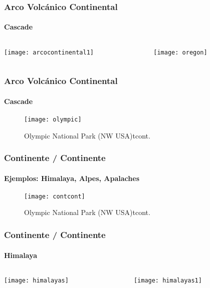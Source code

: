 \documentclass{beamer}
\begin{document}
\begin{frame}
\frametitle{Arco Volcánico Continental}
\framesubtitle{Cascade}
\begin{center}
\begin{columns}
		\begin{column}{.6\linewidth}
		 \texttt{[image: arcocontinental1]}
		\end{column}
		\begin{column}{.4\linewidth}
			 \texttt{[image: oregon]}
		\end{column}
\end{columns}
\end{center}
\end{frame}
\begin{frame}
\frametitle{Arco Volcánico Continental}
\framesubtitle{Cascade}
\begin{center}
\begin{figure}
\texttt{[image: olympic]}
\caption{Olympic National Park (NW USA)tcont.}
\end{figure}
\end{center}
\end{frame}
\begin{frame}
\frametitle{Continente / Continente}
\framesubtitle{Ejemplos: Himalaya, Alpes, Apalaches}
\begin{center}
\begin{figure}
\texttt{[image: contcont]}
\caption{Olympic National Park (NW USA)tcont.}
\end{figure}
\end{center}
\end{frame}
\begin{frame}
\frametitle{Continente / Continente}
\framesubtitle{Himalaya}
\begin{center}
\begin{columns}
		\begin{column}{.4\linewidth}
		 \texttt{[image: himalayas]}
		\end{column}
		\begin{column}{.6\linewidth}
			 \texttt{[image: himalayas1]}
		\end{column}
\end{columns}
\end{center}
\end{frame}
\end{document}
